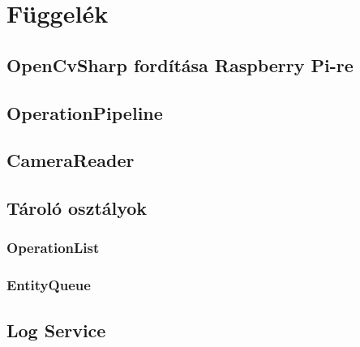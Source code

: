 \appendix

\chapter*{Függelék}

\setcounter{chapter}{6}     %

\newpage


\section{OpenCvSharp fordítása Raspberry Pi-re} \label{rpi-build-script}

\section{OperationPipeline}

\section{CameraReader}

\section{Tároló osztályok}
\subsection{OperationList}

\subsection{EntityQueue}

\section{Log Service}
